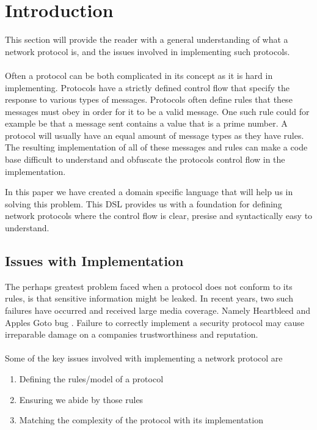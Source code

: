 \section{Introduction}
This section will provide the reader with a general understanding of what a network protocol is, and the issues involved in implementing such protocols.
\\\\
Often a protocol can be both complicated in its concept as it is hard in implementing. Protocols have a strictly defined control flow that specify the response to various types of messages. Protocols often define rules that these messages must obey in order for it to be a valid message. One such rule could for example be that a message sent contains a value that is a prime number. A protocol will usually have an equal amount of message types as they have rules. The resulting implementation of all of these messages and rules can make a code base difficult to understand and obfuscate the protocols control flow in the implementation.

In this paper we have created a domain specific language that will help us in solving this problem. This DSL provides us with a foundation for defining network protocols where the control flow is clear, presise and syntactically easy to understand. 

\subsection{Issues with Implementation}
The perhaps greatest problem faced when a protocol does not conform to its rules, is that sensitive information might be leaked. In recent years, two such failures have occurred and received large media coverage. Namely Heartbleed \cite{durumeric2014matter} and Apples Goto bug \cite{bland2014finding}. Failure to correctly implement a security protocol may  cause irreparable damage on a companies trustworthiness and reputation.
\\\\
Some of the key issues involved with implementing a network protocol are
\begin{enumerate}
  \item Defining the rules/model of a protocol
  \item Ensuring we abide by those rules
  \item Matching the complexity of the protocol with its implementation
\end{enumerate}

